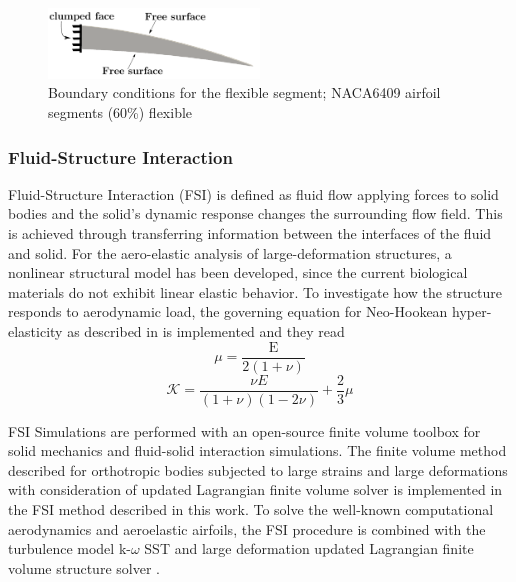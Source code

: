 \documentclass[conf]{new-aiaa}
\begin{document}
\begin{figure}[ht!]
\centering
\includegraphics[width=0.5\textwidth]{Figures/naca6409_solid.pdf}
\caption{ Boundary conditions for the flexible segment; NACA6409 airfoil segments (60\%) flexible }
\label{fig:segments}
\end{figure}



\subsubsection{Fluid-Structure Interaction}

Fluid-Structure Interaction (FSI) is defined as fluid flow applying forces to solid bodies and the solid’s dynamic response changes the surrounding flow field.
%
This is achieved through transferring information between the interfaces of the fluid and solid.
%
For the aero-elastic analysis of large-deformation structures, a nonlinear structural model has been developed, since the current biological materials do not exhibit linear elastic behavior.
%
To investigate how the structure responds to aerodynamic load, the governing equation for Neo-Hookean hyper-elasticity as described in \citet{Wiggins1998ComputationalInelasticity} is implemented and they read
\begin{equation}
\mu= \frac{\mathrm{E}}{2(1+\nu)}
\end{equation}
\begin{equation}
\mathcal{K}= \frac{\nu E}{(1+\nu)(1- 2\nu)} +\frac{2}{3}\mu
\end{equation}
%

FSI Simulations are performed with an open-source finite volume toolbox for solid mechanics and fluid-solid interaction simulations.
%
The finite volume method described for orthotropic bodies subjected to large strains and large deformations with consideration of updated Lagrangian finite volume solver \cite{Tukovic2014} is implemented in the FSI method described in this work.
%
To solve the well-known computational aerodynamics and aeroelastic airfoils, the FSI procedure is combined with the turbulence model k-$\omega$ SST and large deformation updated Lagrangian finite volume structure solver \cite{Cardiff2018}.
\end{document}
